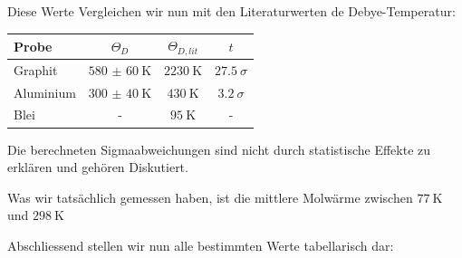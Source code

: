 \documentclass{article}
\newcommand{\schreiben}[1]{{\color{red}\textbf{[TODO::} #1\textbf{]}}}
\begin{document}
Diese Werte Vergleichen wir nun mit den Literaturwerten de Debye-Temperatur:

\begin{table}
	\begin{tabular}{lccc}
		\toprule
		Probe	&$\Theta_{D}$				&$\Theta_{D,lit}$		&$t$\\
		\midrule
		Graphit	& $\qty{580(60)}{\kelvin}$ 	&$\qty{2230}{\kelvin}$	& $\qty{27.5}{\sigma}$\\
		Aluminium&$\qty{300(40)}{\kelvin}$ 	&$\qty{430}{\kelvin}$	& $\qty{3.2}{\sigma}$\\
		Blei	& - 						&$\qty{95}{\kelvin}$	& -\\
		\bottomrule
	\end{tabular}
\end{table}

Die berechneten Sigmaabweichungen sind nicht durch statistische Effekte zu erklären und gehören Diskutiert.

Was wir tatsächlich gemessen haben, ist die mittlere Molwärme zwischen $\qty{77}{\kelvin}$ und $\qty{298}{\kelvin}$


Abschliessend stellen wir nun alle bestimmten Werte tabellarisch dar:
\end{document}
